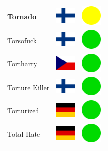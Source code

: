 \documentclass[12pt, a4paper, twoside]{report}
\begin{document}
\begin{center}
\begin{longtable}{|p{5cm}|p{2cm}|p{2cm}|}
 Tornado                                                    & \includegraphics[width=1cm]{../4x3/fi} &   \includegraphics[width=1cm]{../likes/m} \\ \hline
 Torsofuck                                                  & \includegraphics[width=1cm]{../4x3/fi} &   \includegraphics[width=1cm]{../likes/y} \\ \hline
 Tortharry                                                  & \includegraphics[width=1cm]{../4x3/cz} &   \includegraphics[width=1cm]{../likes/y} \\ \hline
 Torture Killer                                             & \includegraphics[width=1cm]{../4x3/fi} &   \includegraphics[width=1cm]{../likes/y} \\ \hline
 Torturized                                                 & \includegraphics[width=1cm]{../4x3/de} &   \includegraphics[width=1cm]{../likes/y} \\ \hline
 Total Hate                                                 & \includegraphics[width=1cm]{../4x3/de} &   \includegraphics[width=1cm]{../likes/y} \\ \hline

\end{longtable}
\end{center}
\end{document}
